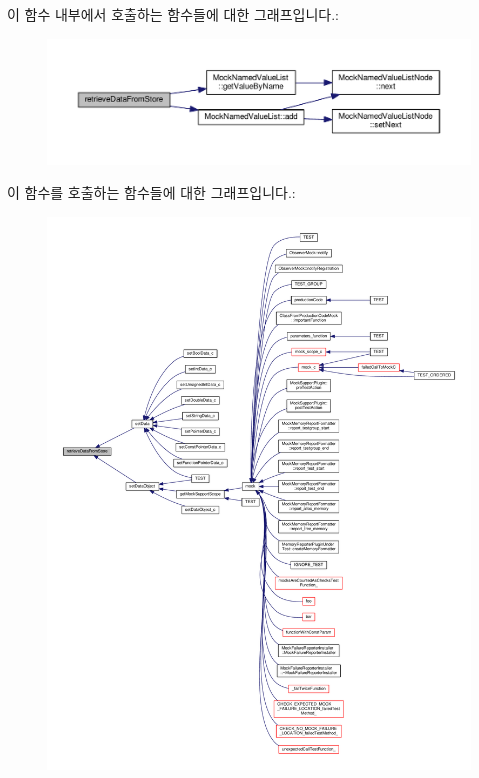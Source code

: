 이 함수 내부에서 호출하는 함수들에 대한 그래프입니다.\+:
\nopagebreak
\begin{figure}[H]
\begin{center}
\leavevmode
\includegraphics[width=350pt]{class_mock_support_a768d0d8dc9e98b4ec064e01e21e14f85_cgraph}
\end{center}
\end{figure}




이 함수를 호출하는 함수들에 대한 그래프입니다.\+:
\nopagebreak
\begin{figure}[H]
\begin{center}
\leavevmode
\includegraphics[width=350pt]{class_mock_support_a768d0d8dc9e98b4ec064e01e21e14f85_icgraph}
\end{center}
\end{figure}


